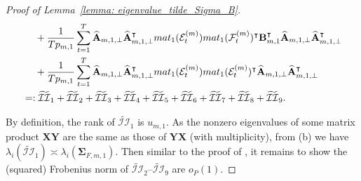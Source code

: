 \documentclass[10pt,a4paper]{amsart}
\def\bA{\mathbf{A}}
\def\bB{\mathbf{B}}
\def\bSigma{\boldsymbol{\Sigma}} \def\bOmega{\boldsymbol{\Omega}}
\def\bX{\mathbf{X}}
\def\bY{\mathbf{Y}}
\def\cE{\mathcal{E}}
\def\cF{\mathcal{F}}
\def\cII{\mathcal{II}}
\def\mat{\textnormal{\textsc{mat}}}
\def\trans{\intercal}
\def\wh#1{\widehat{#1}}
\def\wt#1{\widetilde{#1}}
\begin{document}
\begin{proof}[Proof of Lemma~\ref{lemma: eigenvalue_tilde_Sigma_B}]
\begin{align}
    &\;\quad
    + \frac{1}{Tp_{m,1}} \sum_{t=1}^T \wh{\bA}_{m,1,\perp} \wh{\bA}_{m,1,\perp}^\trans \mat_1(\cE_t^{(m)}) \mat_1(\cF_t^{(m)})^\trans \bB_{m,1}^\trans \wh{\bA}_{m,1,\perp} \wh{\bA}_{m,1,\perp}^\trans \notag \\
    &\;\quad
    + \frac{1}{Tp_{m,1}} \sum_{t=1}^T \wh{\bA}_{m,1,\perp} \wh{\bA}_{m,1,\perp}^\trans \mat_1(\cE_t^{(m)}) \mat_1(\cE_t^{(m)})^\trans \wh{\bA}_{m,1,\perp} \wh{\bA}_{m,1,\perp}^\trans \notag \\
    &=: \wt\cII_1 + \wt\cII_2 + \wt\cII_3 + \wt\cII_4 + \wt\cII_5 + \wt\cII_6 + \wt\cII_7 + \wt\cII_8 + \wt\cII_9 .
    \label{eqn: decomp_tilde_Sigma_B}
\end{align}


By definition, the rank of $\wt\cII_1$ is $u_{m,1}$. As the nonzero eigenvalues of some matrix product $\bX\bY$ are the same as those of $\bY\bX$ (with multiplicity), from (b) we have $\lambda_i(\wt\cII_1) \asymp \lambda_i(\bSigma_{F,m,1})$. Then similar to the proof of , it remains to show the (squared) Frobenius norm of $\wt\cII_2$--$\wt\cII_9$ are $o_P(1)$.


\end{proof}
\end{document}
